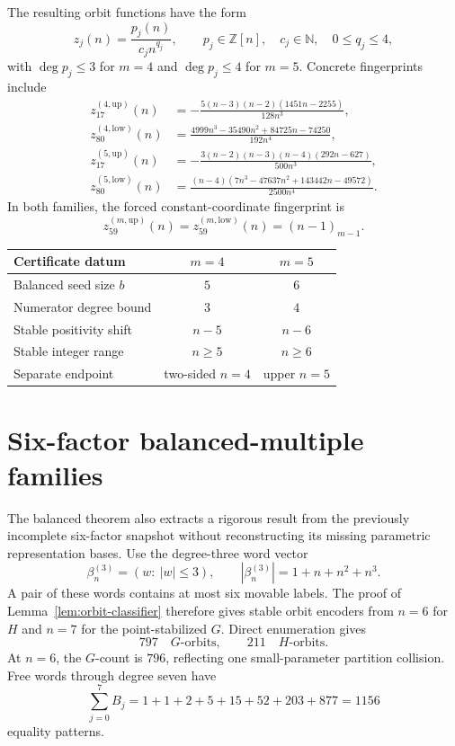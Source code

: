 \documentclass[11pt]{article}
\newcommand{\fall}[2]{(#1)_{#2}}
\newcommand{\up}{\mathrm{up}}
\newcommand{\low}{\mathrm{low}}
\begin{document}
The resulting orbit functions have the form
\[
 z_j(n)=\frac{p_j(n)}{c_jn^{q_j}},
 \qquad
 p_j\in\mathbb Z[n],\quad c_j\in\mathbb N,\quad 0\le q_j\le4,
\]
with \(\deg p_j\le3\) for \(m=4\) and \(\deg p_j\le4\) for \(m=5\).  Concrete fingerprints include
\begin{align*}
 z_{17}^{(4,\up)}(n)
 &=-\frac{5(n-3)(n-2)(1451n-2255)}{128n^3},\\
 z_{80}^{(4,\low)}(n)
 &=\frac{4999n^3-35490n^2+84725n-74250}{192n^4},\\
 z_{17}^{(5,\up)}(n)
 &=-\frac{3(n-2)(n-3)(n-4)(292n-627)}{500n^3},\\
 z_{80}^{(5,\low)}(n)
 &=\frac{(n-4)(7n^3-47637n^2+143442n-49572)}
 {2500n^4}.
\end{align*}
In both families, the forced constant-coordinate fingerprint is
\[
 z_{59}^{(m,\up)}(n)=z_{59}^{(m,\low)}(n)
 =\fall{n-1}{m-1}.
\]

\begin{center}
\begin{tabular}{lcc}
\toprule
Certificate datum & \(m=4\) & \(m=5\)\\
\midrule
Balanced seed size \(b\) & \(5\) & \(6\)\\
Numerator degree bound & \(3\) & \(4\)\\
Stable positivity shift & \(n-5\) & \(n-6\)\\
Stable integer range & \(n\ge5\) & \(n\ge6\)\\
Separate endpoint & two-sided \(n=4\) & upper \(n=5\)\\
\bottomrule
\end{tabular}
\end{center}

\section{Six-factor balanced-multiple families}\label{sec:m6-balanced}

The balanced theorem also extracts a rigorous result from the previously
incomplete six-factor snapshot without reconstructing its missing parametric
representation bases.  Use the degree-three word vector
\[
 \beta_n^{(3)}=(w:\ |w|\le3),\qquad
 |\beta_n^{(3)}|=1+n+n^2+n^3.
\]
A pair of these words contains at most six movable labels.  The proof of
Lemma~\ref{lem:orbit-classifier} therefore gives stable orbit encoders from
\(n=6\) for \(H\) and \(n=7\) for the point-stabilized \(G\).  Direct
enumeration gives
\[
 797\quad G\text{-orbits},\qquad 211\quad H\text{-orbits}.
\]
At \(n=6\), the \(G\)-count is \(796\), reflecting one small-parameter
partition collision.  Free words through degree seven have
\[
 \sum_{j=0}^{7}B_j
 =1+1+2+5+15+52+203+877=1156
\]
equality patterns.
\end{document}
